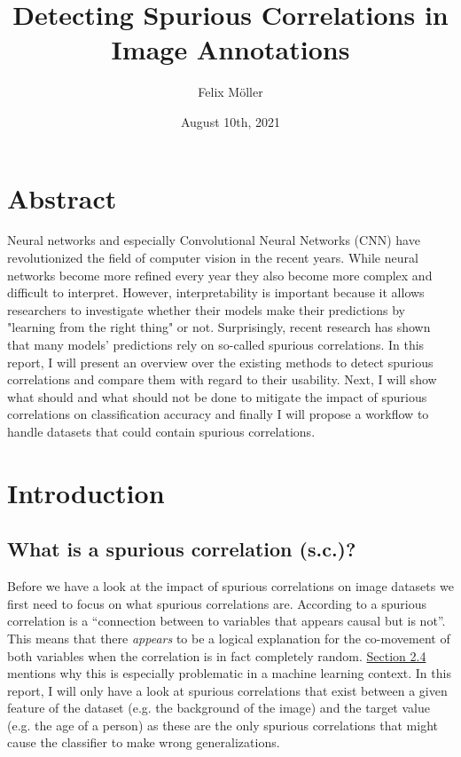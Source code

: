 \documentclass{article}
\title{Detecting Spurious Correlations in Image Annotations}
\author{Felix Möller}
\date{August 10th, 2021}
\begin{document}
\maketitle
\tableofcontents
\newpage
\section{Abstract}
Neural networks and especially Convolutional Neural Networks (CNN) have revolutionized the field of computer vision in the recent years.
While neural networks become more refined every year they also become more complex and difficult to interpret.
However, interpretability is important because it allows researchers to investigate whether their models make
their predictions by "learning from the right thing" or not. Surprisingly, recent research has shown that many models' predictions
rely on so-called spurious correlations. In this report, I will present an overview over the existing methods
to detect spurious correlations and compare them with regard to their usability.
Next, I will show what should and what should not be done to mitigate the impact of spurious correlations on classification
accuracy and finally I will propose a workflow to handle datasets that could contain spurious correlations. 


\section{Introduction}
\subsection{What is a spurious correlation (s.c.)?}
Before we have a look at the impact of spurious correlations on image datasets we first need to focus on what spurious correlations are.
According to \cite{sc_def} a spurious correlation is a \enquote{connection between to variables that appears causal but is not}.
This means that there \textit{appears} to be a logical explanation for the co-movement of both variables when the correlation is in fact completely random.
\hyperref[sec:challenges]{Section 2.4} mentions why this is especially problematic in a machine learning context.
In this report, I will only have a look at spurious correlations that exist between a given feature of the dataset (e.g. the background of the image)
and the target value (e.g. the age of a person) as these are the only spurious correlations that might cause the classifier to make wrong generalizations.
\end{document}
